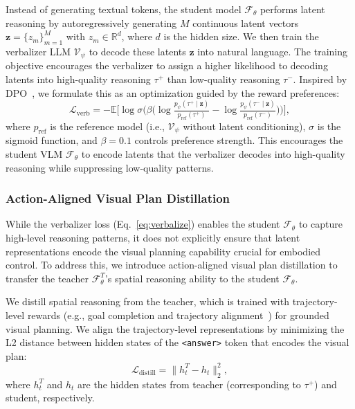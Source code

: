 Instead of generating textual tokens, the student model $\mathcal{F}_\theta$ performs latent reasoning by autoregressively generating $M$ continuous latent vectors $\mathbf{z} = \{z_m\}_{m=1}^M$ with $z_m \in \mathbb{R}^d$, where $d$ is the hidden size. We then train the verbalizer LLM $\mathcal{V}_\psi$ to decode these latents $\mathbf{z}$ into natural language.  The training objective encourages the verbalizer to assign a higher likelihood to decoding latents into high-quality reasoning $\tau^+$ than low-quality reasoning $\tau^-$. Inspired by DPO~\cite{rafailov2023direct}, we formulate this as an optimization guided by the reward preferences:
\begin{equation}
\mathcal{L}_{\text{verb}}
=
-\mathbb{E} \Big[ \log \sigma\Big(
\beta\big(
\log \tfrac{p_\psi(\tau^{+}\mid \mathbf{z})}
          {p_{\text{ref}}(\tau^{+})} -\log \tfrac{p_\psi(\tau^{-}\mid \mathbf{z})}
            {p_{\text{ref}}(\tau^{-})}
\big)\Big)\Big],
\label{eq:verbalize}
\end{equation}
where $p_{\text{ref}}$ is the reference model (i.e., $\mathcal{V}_\psi$ without latent conditioning), $\sigma$ is the sigmoid function, and $\beta=0.1$ controls preference strength. This encourages the student VLM $\mathcal{F}_\theta$ to encode latents that the verbalizer decodes into high-quality reasoning while suppressing low-quality patterns.




\subsubsection{Action-Aligned Visual Plan Distillation}\label{sssec:distill}
While the verbalizer loss (Eq.~\ref{eq:verbalize}) enables the student $\mathcal{F}_\theta$ to capture high-level reasoning patterns, it does not explicitly ensure that latent representations encode the visual planning capability crucial for embodied control. To address this, we introduce action-aligned visual plan distillation to transfer the teacher $\mathcal{F}_\theta^T$'s spatial reasoning ability to the student $\mathcal{F}_\theta$.

We distill spatial reasoning from the teacher, which is trained with trajectory-level rewards (e.g., goal completion and trajectory alignment~\cite{huang2025thinkact}) for grounded visual planning. We align the trajectory-level representations by minimizing the L2 distance between hidden states of the \texttt{<answer>} token that encodes the visual plan:
\begin{equation}
    \mathcal{L}_{\text{distill}} = \| h_t^T - h_t \|_2^2,
\end{equation}
where $h_t^T$ and $h_t$ are the hidden states from teacher (corresponding to $\tau^+$) and student, respectively.

